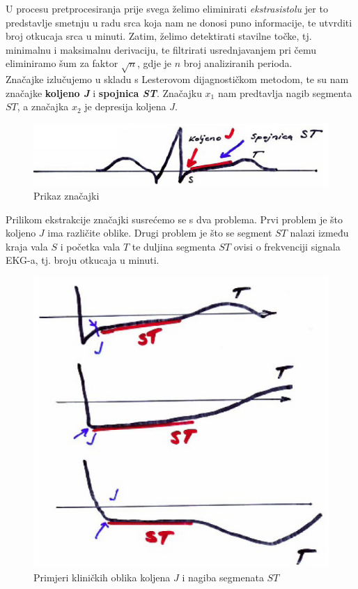 \documentclass{book}
\begin{document}
U procesu pretprocesiranja prije svega želimo eliminirati
\textit{ekstrasistolu} jer to predstavlje smetnju u radu srca koja nam ne donosi
puno informacije, te utvrditi broj otkucaja srca u minuti. Zatim, želimo
detektirati stavilne točke, tj. minimalnu i maksimalnu derivaciju, te filtrirati
usrednjavanjem pri čemu eliminiramo šum za faktor $\sqrt{n}$, gdje je $n$ broj
analiziranih perioda.  \\

Značajke izlučujemo u skladu s Lesterovom dijagnostičkom metodom, te su nam
značajke \textbf{koljeno \textit{J}} i \textbf{spojnica \textit{ST}}. Značajku
$x_1$ nam predtavlja nagib segmenta $ST$, a značajka $x_2$ je depresija koljena
$J$.

\begin{figure}[H]
 \begin{center}
 \includegraphics[scale=0.5]{./pics/znacajke}
 \caption{Prikaz značajki}
 \end{center}
 \end{figure}
 
Prilikom ekstrakcije značajki susrećemo se s dva problema. Prvi problem je što
koljeno $J$ ima različite oblike. Drugi problem je što se segment $ST$ nalazi
između kraja vala $S$ i početka vala $T$ te duljina segmenta $ST$ ovisi o
frekvenciji signala EKG-a, tj. broju otkucaja u minuti.

\begin{figure}
 \begin{center}
 \includegraphics[scale=0.5]{./pics/primjerJiST}
 \caption{Primjeri kliničkih oblika koljena $J$ i nagiba segmenata $ST$}
 \end{center}
 \end{figure}
\end{document}
